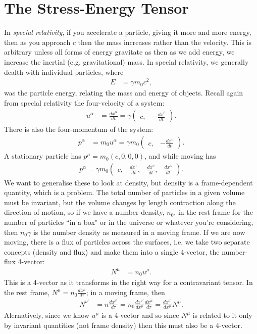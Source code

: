 \documentclass[a4paper, 11pt, normalem]{report}
\begin{document}
\section{The Stress-Energy Tensor}
In \emph{special relativity}, if you accelerate a particle, giving it more and more energy, then as you approach $c$ then the mass increases rather than the velocity. 
This is arbitrary unless all forms of energy gravitate as then as we add energy, we increase the inertial (e.g. gravitational) mass. 
In special relativity, we generally dealth with individual particles, where
\begin{align}
    E &= \gamma m_0c^2,
\end{align}
was the particle energy, relating the mass and energy of objects.
Recall again from special relativity the four-velocity of a system:
\begin{align}
    u^\alpha &= \frac{dx^\alpha}{dt} = \gamma\begin{pmatrix} c, & -\frac{dx^i}{dt}\end{pmatrix}.
\end{align}
There is also the four-momentum of the system:
\begin{align}
    p^\alpha &= m_0u^\alpha = \gamma m_0\begin{pmatrix} c, & -\frac{dx^i}{dt} \end{pmatrix}.
\end{align}
A stationary particle has $p^\mu = m_0(c,0,0,0)$, and while moving has
\begin{align}
    p^\alpha = \gamma m_0\begin{pmatrix} c, & \frac{dx^1}{dt}, & \frac{dx^2}{dt}, & \frac{dx^3}{dt} \end{pmatrix}.
\end{align}
We  want to generalise these to look at density, but density is a frame-dependent quantity, which is a problem. 
The total number of particles in a given volume must be invariant, but the volume changes by length contraction along the direction of motion, so if we have a number density, $n_0$, in the rest frame for the number of particles ``in a box" or in the universe or whatever you're considering, then $n_0\gamma$ is the number density as measured in a moving frame. 
If we are now moving, there is a flux of particles across the surfaces, i.e. we take two separate concepts (density and flux) and make them into a single 4-vector, the number-flux 4-vector:
\begin{align}
    N^\mu &= n_0u^\mu.
\end{align}
This is a 4-vector as it transforms in the right way for a contravariant tensor.
In the rest frame, $N^\mu = n_0\frac{dx^\mu}{d\tau}$; in a moving frame, then
\begin{align}
    N^{\nu'} &= n\frac{dx^{\nu'}}{d\tau} = n_0\frac{dx^{\nu'}}{dx^\mu}\frac{dx^\mu}{d\tau} = \frac{dx^{\nu'}}{dx^\mu}N^\mu.
\end{align}
Alernatively, since we know $u^\mu$ is a 4-vector and so since $N^\mu$ is related to it only by invariant quantities (not frame density) then this must also be a 4-vector. 
\end{document}
